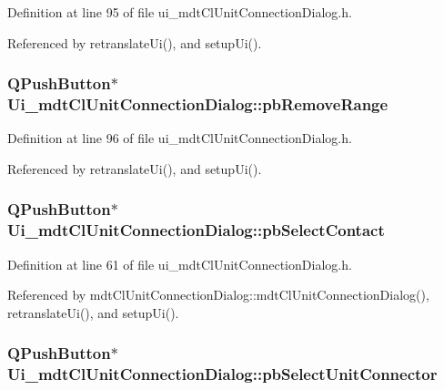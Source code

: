 Definition at line 95 of file ui\-\_\-mdt\-Cl\-Unit\-Connection\-Dialog.\-h.



Referenced by retranslate\-Ui(), and setup\-Ui().

\hypertarget{class_ui__mdt_cl_unit_connection_dialog_a685c83b9d3da67ceee2cb1cbda8f06ac}{
\subsubsection[{pb\-Remove\-Range}]{\setlength{\rightskip}{0pt plus 5cm}Q\-Push\-Button$\ast$ Ui\-\_\-mdt\-Cl\-Unit\-Connection\-Dialog\-::pb\-Remove\-Range}}\label{class_ui__mdt_cl_unit_connection_dialog_a685c83b9d3da67ceee2cb1cbda8f06ac}


Definition at line 96 of file ui\-\_\-mdt\-Cl\-Unit\-Connection\-Dialog.\-h.



Referenced by retranslate\-Ui(), and setup\-Ui().

\hypertarget{class_ui__mdt_cl_unit_connection_dialog_a61cc80762082f8291dedbac6e96d55d4}{
\subsubsection[{pb\-Select\-Contact}]{\setlength{\rightskip}{0pt plus 5cm}Q\-Push\-Button$\ast$ Ui\-\_\-mdt\-Cl\-Unit\-Connection\-Dialog\-::pb\-Select\-Contact}}\label{class_ui__mdt_cl_unit_connection_dialog_a61cc80762082f8291dedbac6e96d55d4}


Definition at line 61 of file ui\-\_\-mdt\-Cl\-Unit\-Connection\-Dialog.\-h.



Referenced by mdt\-Cl\-Unit\-Connection\-Dialog\-::mdt\-Cl\-Unit\-Connection\-Dialog(), retranslate\-Ui(), and setup\-Ui().

\hypertarget{class_ui__mdt_cl_unit_connection_dialog_a61b49b8b83d523222ee29f4d92de184f}{
\subsubsection[{pb\-Select\-Unit\-Connector}]{\setlength{\rightskip}{0pt plus 5cm}Q\-Push\-Button$\ast$ Ui\-\_\-mdt\-Cl\-Unit\-Connection\-Dialog\-::pb\-Select\-Unit\-Connector}}\label{class_ui__mdt_cl_unit_connection_dialog_a61b49b8b83d523222ee29f4d92de184f}


